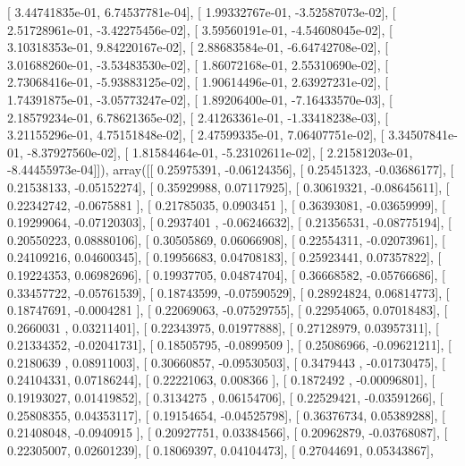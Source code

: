 \documentclass{article}
\begin{document}
       [  3.44741835e-01,   6.74537781e-04],
       [  1.99332767e-01,  -3.52587073e-02],
       [  2.51728961e-01,  -3.42275456e-02],
       [  3.59560191e-01,  -4.54608045e-02],
       [  3.10318353e-01,   9.84220167e-02],
       [  2.88683584e-01,  -6.64742708e-02],
       [  3.01688260e-01,  -3.53483530e-02],
       [  1.86072168e-01,   2.55310690e-02],
       [  2.73068416e-01,  -5.93883125e-02],
       [  1.90614496e-01,   2.63927231e-02],
       [  1.74391875e-01,  -3.05773247e-02],
       [  1.89206400e-01,  -7.16433570e-03],
       [  2.18579234e-01,   6.78621365e-02],
       [  2.41263361e-01,  -1.33418238e-03],
       [  3.21155296e-01,   4.75151848e-02],
       [  2.47599335e-01,   7.06407751e-02],
       [  3.34507841e-01,  -8.37927560e-02],
       [  1.81584464e-01,  -5.23102611e-02],
       [  2.21581203e-01,  -8.44455973e-04]]), array([[ 0.25975391, -0.06124356],
       [ 0.25451323, -0.03686177],
       [ 0.21538133, -0.05152274],
       [ 0.35929988,  0.07117925],
       [ 0.30619321, -0.08645611],
       [ 0.22342742, -0.0675881 ],
       [ 0.21785035,  0.0903451 ],
       [ 0.36393081, -0.03659999],
       [ 0.19299064, -0.07120303],
       [ 0.2937401 , -0.06246632],
       [ 0.21356531, -0.08775194],
       [ 0.20550223,  0.08880106],
       [ 0.30505869,  0.06066908],
       [ 0.22554311, -0.02073961],
       [ 0.24109216,  0.04600345],
       [ 0.19956683,  0.04708183],
       [ 0.25923441,  0.07357822],
       [ 0.19224353,  0.06982696],
       [ 0.19937705,  0.04874704],
       [ 0.36668582, -0.05766686],
       [ 0.33457722, -0.05761539],
       [ 0.18743599, -0.07590529],
       [ 0.28924824,  0.06814773],
       [ 0.18747691, -0.0004281 ],
       [ 0.22069063, -0.07529755],
       [ 0.22954065,  0.07018483],
       [ 0.2660031 ,  0.03211401],
       [ 0.22343975,  0.01977888],
       [ 0.27128979,  0.03957311],
       [ 0.21334352, -0.02041731],
       [ 0.18505795, -0.0899509 ],
       [ 0.25086966, -0.09621211],
       [ 0.2180639 ,  0.08911003],
       [ 0.30660857, -0.09530503],
       [ 0.3479443 , -0.01730475],
       [ 0.24104331,  0.07186244],
       [ 0.22221063,  0.008366  ],
       [ 0.1872492 , -0.00096801],
       [ 0.19193027,  0.01419852],
       [ 0.3134275 ,  0.06154706],
       [ 0.22529421, -0.03591266],
       [ 0.25808355,  0.04353117],
       [ 0.19154654, -0.04525798],
       [ 0.36376734,  0.05389288],
       [ 0.21408048, -0.0940915 ],
       [ 0.20927751,  0.03384566],
       [ 0.20962879, -0.03768087],
       [ 0.22305007,  0.02601239],
       [ 0.18069397,  0.04104473],
       [ 0.27044691,  0.05343867],
\end{document}
